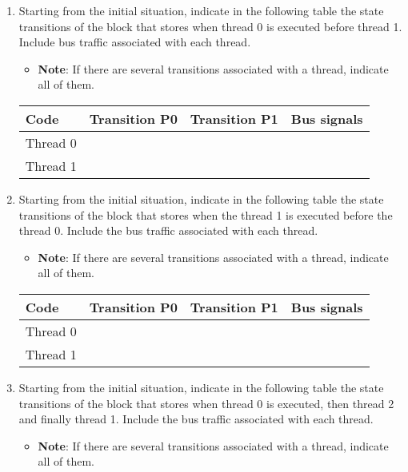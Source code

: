 \begin{enumerate}

\item Starting from the initial situation, indicate in the following table the
state transitions of the block that stores  when
thread 0 is executed before thread 1. 
Include bus traffic associated with each thread.
 
  \begin{itemize}
    \item \textbf{Note}: If there are several transitions associated with a thread,
          indicate all of them.
  \end{itemize}

\begin{tabular}{|l|l|l|l|}
\hline
Code & Transition P0 & Transition P1 & Bus signals\\
\hline\hline
Thread 0 & & & \\
\hline
Thread 1 & & & \\
\hline
\end{tabular}

\item Starting from the initial situation, indicate in the following table the
state transitions of the block that stores  when the
thread 1 is executed before the thread 0. Include the bus traffic
associated with each thread.
 

  \begin{itemize}
    \item \textbf{Note}: If there are several transitions associated with a thread,
          indicate all of them.
  \end{itemize}

\begin{tabular}{|l|l|l|l|}
\hline
Code & Transition P0 & Transition P1 & Bus signals\\
\hline\hline
Thread 0 & & & \\
\hline
Thread 1 & & & \\
\hline
\end{tabular}

\item Starting from the initial situation, indicate in the following table the
state transitions of the block that stores  when 
thread 0 is executed, then  thread 2 and finally  thread 1. Include the bus traffic
associated with each thread.

  \begin{itemize}
    \item \textbf{Note}: If there are several transitions associated with a thread,
          indicate all of them.
  \end{itemize}


\end{enumerate}
